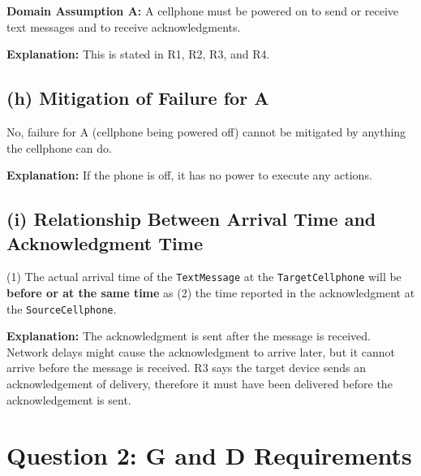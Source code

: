 \documentclass{article}
\begin{document}
\textbf{Domain Assumption A:} A cellphone must be powered on to send or receive text messages and to receive acknowledgments.

\textbf{Explanation:} This is stated in R1, R2, R3, and R4.

\subsection*{(h) Mitigation of Failure for A}

No, failure for A (cellphone being powered off) cannot be mitigated by anything the cellphone can do.

\textbf{Explanation:} If the phone is off, it has no power to execute any actions.

\subsection*{(i) Relationship Between Arrival Time and Acknowledgment Time}

(1) The actual arrival time of the \texttt{TextMessage} at the \texttt{TargetCellphone} will be \textbf{before or at the same time} as (2) the time reported in the acknowledgment at the \texttt{SourceCellphone}.

\textbf{Explanation:} The acknowledgment is sent after the message is received. Network delays might cause the acknowledgment to arrive later, but it cannot arrive before the message is received. R3 says the target device sends an acknowledgement of delivery, therefore it must have been delivered before the acknowledgement is sent.

\section*{Question 2: G and D Requirements}
\end{document}
